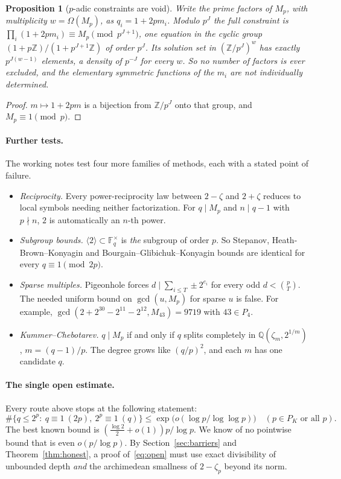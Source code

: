 \documentclass[11pt]{amsart}
\newtheorem{proposition}[theorem]{Proposition}
\theoremstyle{definition}
\theoremstyle{remark}
\newcommand{\Z}{\mathbb{Z}}
\newcommand{\Q}{\mathbb{Q}}
\newcommand{\F}{\mathbb{F}}
\begin{document}
\begin{proposition}[$p$-adic constraints are void]
Write the prime factors of $M_p$, with multiplicity $w=\Omega(M_p)$, as $q_i=1+2pm_i$. Modulo $p^J$ the full constraint
is $\prod_i(1+2pm_i)\equiv M_p\pmod{p^{J+1}}$, one equation in the cyclic group $(1+p\Z)/(1+p^{J+1}\Z)$ of order
$p^J$. Its solution set in $(\Z/p^J)^w$ has exactly $p^{J(w-1)}$ elements, a density of $p^{-J}$ for every $w$. So no
number of factors is ever excluded, and the elementary symmetric functions of the $m_i$ are not individually determined.
\end{proposition}
\begin{proof}
$m\mapsto1+2pm$ is a bijection from $\Z/p^J$ onto that group, and $M_p\equiv1\pmod p$.
\end{proof}

\paragraph{Further tests.} The working notes test four more families of methods, each with a stated point of failure.
\begin{itemize}
\item \emph{Reciprocity.} Every power-reciprocity law between $2-\zeta$ and $2+\zeta$ reduces to local symbols needing
neither factorization. For $q\mid M_p$ and $n\mid q-1$ with $p\nmid n$, $2$ is automatically an $n$-th power.
\item \emph{Subgroup bounds.} $\langle2\rangle\subset\F_q^\times$ is \emph{the} subgroup of order $p$. So
Stepanov, Heath-Brown--Konyagin and Bourgain--Glibichuk--Konyagin bounds are identical for every $q\equiv1\pmod{2p}$.
\item \emph{Sparse multiples.} Pigeonhole forces $d\mid\sum_{i\le T}\pm2^{e_i}$ for every odd $d<\binom pT$. The
needed uniform bound on $\gcd(u,M_p)$ for sparse $u$ is false. For example, $\gcd(2+2^{30}-2^{11}-2^{12},M_{43})=9719$
with $43\in P_4$.
\item \emph{Kummer--Chebotarev.} $q\mid M_p$ if and only if $q$ splits completely in $\Q(\zeta_m,2^{1/m})$,
$m=(q-1)/p$. The degree grows like $(q/p)^2$, and each $m$ has one candidate $q$.
\end{itemize}

\paragraph{The single open estimate.} Every route above stops at the following statement:
\begin{equation}\label{eq:open}
\#\{q\le2^p:\ q\equiv1\ (2p),\ 2^p\equiv1\ (q)\}\le\exp\bigl(o(\log p/\log\log p)\bigr)\quad(p\in P_K\text{ or all }p).
\end{equation}
The best known bound is $(\frac{\log2}2+o(1))p/\log p$. We know of no pointwise bound that is even $o(p/\log p)$.
By Section~\ref{sec:barriers} and Theorem~\ref{thm:honest}, a proof of~\eqref{eq:open} must use exact divisibility of
unbounded depth \emph{and} the archimedean smallness of $2-\zeta_p$ beyond its norm.
\end{document}

